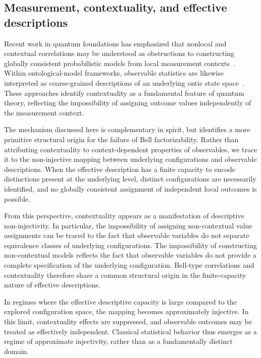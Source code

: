 \subsection{Measurement, contextuality, and effective descriptions}
  \label{subsec:contextuality}

  Recent work in quantum foundations has emphasized that nonlocal and contextual
  correlations may be understood as obstructions to constructing globally consistent
  probabilistic models from local measurement contexts~\cite{AbramskyBrandenburger2011}.
  Within ontological-model frameworks, observable statistics are likewise interpreted
  as coarse-grained descriptions of an underlying ontic state space~\cite{Spekkens2007}.
  These approaches identify contextuality as a fundamental feature of quantum theory,
  reflecting the impossibility of assigning outcome values independently of the
  measurement context.

  The mechanism discussed here is complementary in spirit, but identifies a more
  primitive structural origin for the failure of Bell factorizability.
  Rather than attributing contextuality to context-dependent properties of observables,
  we trace it to the non-injective mapping between underlying configurations and
  observable descriptions.
  When the effective description has a finite capacity to encode distinctions present
  at the underlying level, distinct configurations are necessarily identified, and no
  globally consistent assignment of independent local outcomes is possible.

  From this perspective, contextuality appears as a manifestation of descriptive
  non-injectivity.
  In particular, the impossibility of assigning non-contextual value assignments
  can be traced to the fact that observable variables do not separate equivalence classes
  of underlying configurations.
  The impossibility of constructing non-contextual models reflects the fact that
  observable variables do not provide a complete specification of the underlying
  configuration.
  Bell-type correlations and contextuality therefore share a common structural origin
  in the finite-capacity nature of effective descriptions.

  In regimes where the effective descriptive capacity is large compared to the
  explored configuration space, the mapping becomes approximately injective.
  In this limit, contextuality effects are suppressed, and observable outcomes may be
  treated as effectively independent.
  Classical statistical behavior thus emerges as a regime of approximate injectivity,
  rather than as a fundamentally distinct domain.

